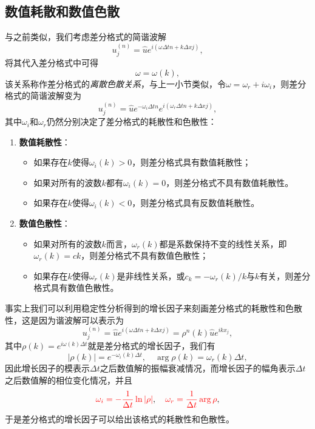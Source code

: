 \documentclass[a4paper,10pt]{ctexart}
\begin{document}
\subsection{数值耗散和数值色散}
与之前类似，我们考虑差分格式的简谐波解
\begin{equation}
    u^{(n)}_j = \hat{u} e^{i(\omega \Delta t n + k\Delta x j)},
\end{equation}
将其代入差分格式中可得
\[
    \omega = \omega(k),
\]
该关系称作差分格式的\emph{离散色散关系}，与上一小节类似，令$ \omega = \omega_r + i\omega_i $，则差分格式的简谐波解变为
\[
    u^{(n)}_j = \hat{u} e^{-\omega_i \Delta t n} e^{i(\omega_r \Delta t n + k\Delta x j)},
\]
其中$ \omega_i $和$ \omega_r $仍然分别决定了差分格式的耗散性和色散性：
\begin{enumerate}
    \item \textbf{数值耗散性}：
    \begin{itemize}
        \item 如果存在$ k $使得$ \omega_i(k)>0 $，则差分格式具有数值耗散性；
        \item 如果对所有的波数$ k $都有$ \omega_i(k)=0 $，则差分格式不具有数值耗散性。
        \item 如果存在$ k $使得$ \omega_i(k)<0 $，则差分格式具有反数值耗散性。
    \end{itemize}
    \item \textbf{数值色散性}：
    \begin{itemize}
        \item 如果对所有的波数$ k $而言，$ \omega_r(k) $都是系数保持不变的线性关系，即$ \omega_r(k) = ck $，则差分格式不具有数值色散性；
        \item 如果存在$ k $使得$ \omega_r(k) $是非线性关系，或$ c_k=-\omega_r(k) / k $与$ k $有关，则差分格式具有数值色散性。
    \end{itemize}
\end{enumerate}

事实上我们可以利用稳定性分析得到的增长因子来刻画差分格式的耗散性和色散性，这是因为谐波解可以表示为
\[
    u^{(n)}_j = \hat{u} e^{i(\omega \Delta t n + k\Delta x j)} =  \rho^n(k) \hat{u} e^{ikx_j},
\]
其中$ \rho(k) = e^{i \omega(k)\Delta t} $就是差分格式的增长因子，我们有
\[
    |\rho(k)| = e^{-\omega_i(k)\Delta t}, \quad \arg \rho(k) = \omega_r(k)\Delta t,
\]
因此增长因子的模表示$ \Delta t $之后数值解的振幅衰减情况，而增长因子的幅角表示$ \Delta t $之后数值解的相位变化情况，并且
\begin{equation}
    \textcolor{red}{\omega_i = -\frac{1}{\Delta t} \ln |\rho|}, \quad \textcolor{red}{\omega_r = \frac{1}{\Delta t} \arg \rho},
\end{equation}
于是差分格式的增长因子可以给出该格式的耗散性和色散性。
\end{document}
